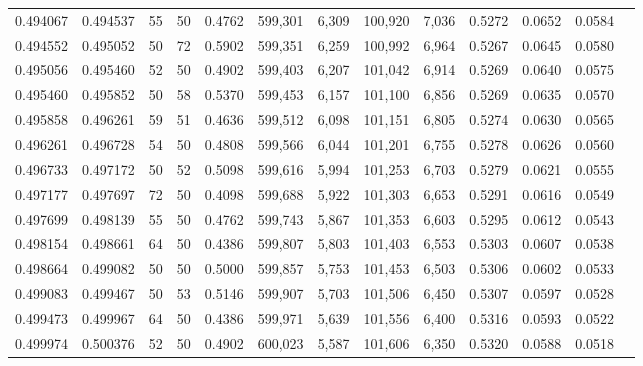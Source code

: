 \begin{tabular}{rrrrrrrrrrrrr}
0.494067 & 0.494537 &    55 &  50 &                                     0.4762 & 599,301 &   6,309 & 100,920 &   7,036 & 0.5272 & 0.0652 & 0.0584 \\
0.494552 & 0.495052 &    50 &  72 &                                     0.5902 & 599,351 &   6,259 & 100,992 &   6,964 & 0.5267 & 0.0645 & 0.0580 \\
0.495056 & 0.495460 &    52 &  50 &                                     0.4902 & 599,403 &   6,207 & 101,042 &   6,914 & 0.5269 & 0.0640 & 0.0575 \\
0.495460 & 0.495852 &    50 &  58 &                                     0.5370 & 599,453 &   6,157 & 101,100 &   6,856 & 0.5269 & 0.0635 & 0.0570 \\
0.495858 & 0.496261 &    59 &  51 &                                     0.4636 & 599,512 &   6,098 & 101,151 &   6,805 & 0.5274 & 0.0630 & 0.0565 \\
0.496261 & 0.496728 &    54 &  50 &                                     0.4808 & 599,566 &   6,044 & 101,201 &   6,755 & 0.5278 & 0.0626 & 0.0560 \\
0.496733 & 0.497172 &    50 &  52 &                                     0.5098 & 599,616 &   5,994 & 101,253 &   6,703 & 0.5279 & 0.0621 & 0.0555 \\
0.497177 & 0.497697 &    72 &  50 &                                     0.4098 & 599,688 &   5,922 & 101,303 &   6,653 & 0.5291 & 0.0616 & 0.0549 \\
0.497699 & 0.498139 &    55 &  50 &                                     0.4762 & 599,743 &   5,867 & 101,353 &   6,603 & 0.5295 & 0.0612 & 0.0543 \\
0.498154 & 0.498661 &    64 &  50 &                                     0.4386 & 599,807 &   5,803 & 101,403 &   6,553 & 0.5303 & 0.0607 & 0.0538 \\
0.498664 & 0.499082 &    50 &  50 &                                     0.5000 & 599,857 &   5,753 & 101,453 &   6,503 & 0.5306 & 0.0602 & 0.0533 \\
0.499083 & 0.499467 &    50 &  53 &                                     0.5146 & 599,907 &   5,703 & 101,506 &   6,450 & 0.5307 & 0.0597 & 0.0528 \\
0.499473 & 0.499967 &    64 &  50 &                                     0.4386 & 599,971 &   5,639 & 101,556 &   6,400 & 0.5316 & 0.0593 & 0.0522 \\
0.499974 & 0.500376 &    52 &  50 &                                     0.4902 & 600,023 &   5,587 & 101,606 &   6,350 & 0.5320 & 0.0588 & 0.0518 \\

\end{tabular}
